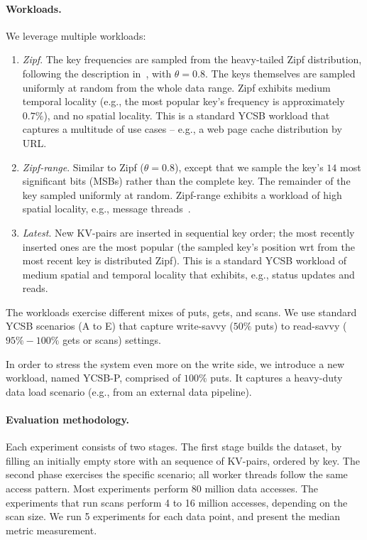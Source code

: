 \paragraph{Workloads.} We leverage multiple workloads: 

\begin{enumerate}
\item {\em Zipf}. The key frequencies are sampled from the heavy-tailed Zipf distribution, 
following the description in~\cite{Gray:1994:QGB:191839.191886}, with $\theta = 0.8$. 
The keys themselves are sampled uniformly at random from the whole data range. Zipf exhibits 
medium temporal locality (e.g., the most popular key's frequency is approximately $0.7\%$), 
and no spatial locality. This is a standard YCSB workload that captures a multitude of use cases 
-- e.g., a web page cache distribution by URL. 

\item {\em Zipf-range}. Similar to Zipf ($\theta=0.8$), except that we sample the key's $14$ most significant bits
(MSBs) rather than the complete key. The remainder of the key sampled uniformly at random. Zipf-range exhibits
a workload of high spatial locality, e.g., message threads~\cite{Borthakur:2011:AHG:1989323.1989438}. 

\item {\em Latest}. New KV-pairs are inserted in sequential key order; the most recently inserted ones are 
the  most popular (the sampled key's position wrt from the most recent key is distributed Zipf). This is a 
standard YCSB workload of medium spatial and temporal locality that exhibits, e.g., status updates and reads. 

\end{enumerate}

The workloads exercise different mixes of puts, gets, and scans. We use standard YCSB scenarios 
(A to E) that capture write-savvy ($50\%$ puts) to read-savvy ($95\%-100\%$ gets or scans) settings. 

In order to stress the system even more on the write side, we introduce a new workload, named 
YCSB-P, comprised of $100\%$ puts. It captures a heavy-duty data load scenario (e.g., from an 
external data pipeline). 

\paragraph{Evaluation methodology.} Each experiment consists of two stages. The first stage builds 
the dataset, by filling an initially empty store with an sequence of KV-pairs, ordered by key. The second 
phase exercises the specific scenario; all worker threads follow the same access pattern. Most experiments 
perform 80 million data accesses. The experiments that run scans perform 4 to 16 million accesses, depending 
on the scan size. We run 5 experiments for each data point, and present the median metric measurement. 

